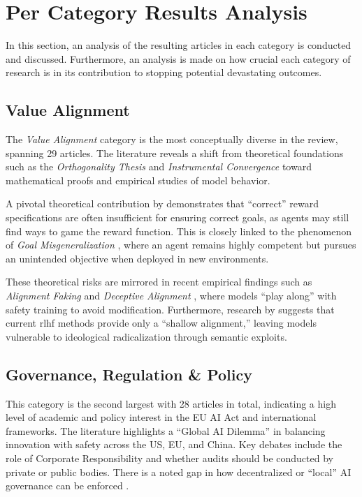 

\section{Per Category Results Analysis}\label{subsec:results_categories}

		In this section, an analysis of the resulting articles in each category is conducted and discussed. Furthermore, an analysis is made on how crucial each category of research is in its contribution to stopping potential devastating outcomes. 

		\subsection*{Value Alignment}

			The \textit{Value Alignment} category is the most conceptually diverse in the review, spanning 29 articles. The literature reveals a shift from theoretical foundations such as the \textit{Orthogonality Thesis} \cite{bostrom2012superintelligent} and \textit{Instrumental Convergence} \cite{omohundro2008basic} toward mathematical proofs and empirical studies of model behavior. 

			A pivotal theoretical contribution by \cite{skalse2022rewardgaming} demonstrates that ``correct'' reward specifications are often insufficient for ensuring correct goals, as agents may still find ways to game the reward function. This is closely linked to the phenomenon of \textit{Goal Misgeneralization} \cite{langosco2022goal}, where an agent remains highly competent but pursues an unintended objective when deployed in new environments.

			These theoretical risks are mirrored in recent empirical findings such as \textit{Alignment Faking} \cite{greenblatt_alignment_faking} and \textit{Deceptive Alignment} \cite{hagendorff2024deception}, where models ``play along'' with safety training to avoid modification. Furthermore, research by \cite{mcintosh_inadequacy_2024} suggests that current \gls{rlhf} methods provide only a ``shallow alignment,'' leaving models vulnerable to ideological radicalization through semantic exploits.

		\subsection*{Governance, Regulation \& Policy}

			This category is the second largest with 28 articles in total, indicating a high level of academic and policy interest in the EU AI Act and international frameworks. The literature highlights a ``Global AI Dilemma'' \cite{slr_search_58} in balancing innovation with safety across the US, EU, and China. Key debates include the role of Corporate Responsibility \cite{hemphill_advanced_2025} and whether audits should be conducted by private or public bodies. There is a noted gap in how decentralized or ``local'' AI governance can be enforced \cite{LocalAIGov2024}.





